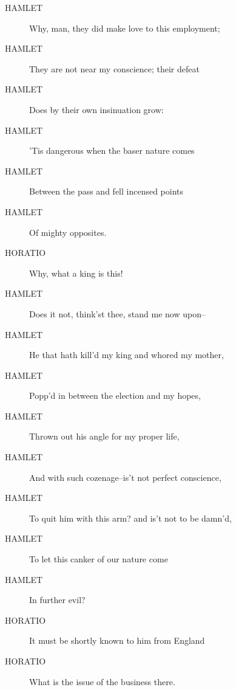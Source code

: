 \documentclass{article}
\begin{document}
\begin{description}
            
\item[HAMLET] Why, man, they did make love to this employment;
\item[HAMLET] They are not near my conscience; their defeat
\item[HAMLET] Does by their own insinuation grow:
\item[HAMLET] 'Tis dangerous when the baser nature comes
\item[HAMLET] Between the pass and fell incensed points
\item[HAMLET] Of mighty opposites.
\end{description}
          
\begin{description}
            
\item[HORATIO] Why, what a king is this!
\end{description}
          
\begin{description}
            
\item[HAMLET] Does it not, think'st thee, stand me now upon--
\item[HAMLET] He that hath kill'd my king and whored my mother,
\item[HAMLET] Popp'd in between the election and my hopes,
\item[HAMLET] Thrown out his angle for my proper life,
\item[HAMLET] And with such cozenage--is't not perfect conscience,
\item[HAMLET] To quit him with this arm? and is't not to be damn'd,
\item[HAMLET] To let this canker of our nature come
\item[HAMLET] In further evil?
\end{description}
          
\begin{description}
            
\item[HORATIO] It must be shortly known to him from England
\item[HORATIO] What is the issue of the business there.
\end{description}
          
\end{document}
